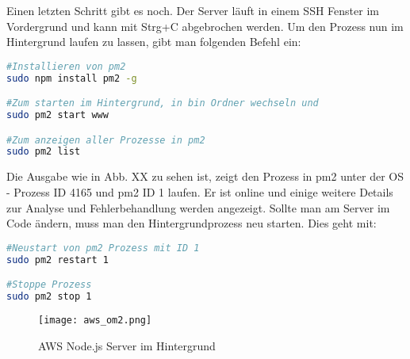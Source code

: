 Einen letzten Schritt gibt es noch. Der Server läuft in einem SSH Fenster im Vordergrund und kann mit Strg+C abgebrochen werden. Um den Prozess nun im Hintergrund laufen zu lassen, gibt man folgenden Befehl ein:

\begin{lstlisting}[language=bash]
#Installieren von pm2
sudo npm install pm2 -g

#Zum starten im Hintergrund, in bin Ordner wechseln und
sudo pm2 start www

#Zum anzeigen aller Prozesse in pm2
sudo pm2 list
\end{lstlisting}

Die Ausgabe wie in Abb. XX zu sehen ist, zeigt den Prozess in pm2 unter der OS - Prozess ID 4165 und pm2 ID 1 laufen. Er ist online und einige weitere Details zur Analyse und Fehlerbehandlung werden angezeigt. Sollte man am Server im Code ändern, muss man den Hintergrundprozess neu starten. Dies geht mit:

\begin{lstlisting}[language=bash]
#Neustart von pm2 Prozess mit ID 1
sudo pm2 restart 1

#Stoppe Prozess
sudo pm2 stop 1
\end{lstlisting}

\begin{center}
\begin{figure}[h]
    \centering
    \texttt{[image: aws\_om2.png]}
    \caption{AWS Node.js Server im Hintergrund}
\end{figure}
\end{center}


\newpage